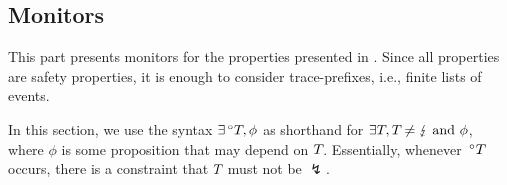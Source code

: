 \subsection{Monitors}\label{subsec-cs-monitors}

This part presents monitors for the properties presented in .
Since all properties are safety properties, it is enough to consider trace-prefixes, i.e., finite lists of events.

In this section, we use the syntax $\exists{\,^\circ}T_{}, \phi$ as shorthand for $\exists T_{}, T_{}\not=\lightning \text{ and } \phi$, where $\phi$ is some proposition that may depend on $T_{}$.
Essentially, whenever ${\,^\circ}T_{}$ occurs, there is a constraint that $T_{}$ must not be $\lightning$.









